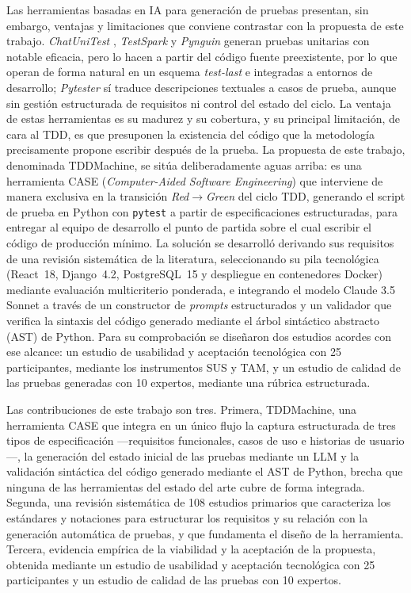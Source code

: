 \documentclass[10pt,journal,twoside,letterpaper]{IEEEtran}
\begin{document}
	Las herramientas basadas en IA para generación de pruebas presentan, sin embargo, ventajas y limitaciones que conviene contrastar con la propuesta de este trabajo. \emph{ChatUniTest} \cite{chen2024chatunitest}, \emph{TestSpark} \cite{sapozhnikov2024testspark} y \emph{Pynguin} \cite{lukasczyk2022pynguin} generan pruebas unitarias con notable eficacia, pero lo hacen a partir del código fuente preexistente, por lo que operan de forma natural en un esquema \emph{test-last} e integradas a entornos de desarrollo; \emph{Pytester} \cite{takerngsaksiri2025pytester} sí traduce descripciones textuales a casos de prueba, aunque sin gestión estructurada de requisitos ni control del estado del ciclo. La ventaja de estas herramientas es su madurez y su cobertura, y su principal limitación, de cara al TDD, es que presuponen la existencia del código que la metodología precisamente propone escribir después de la prueba. La propuesta de este trabajo, denominada TDDMachine, se sitúa deliberadamente aguas arriba: es una herramienta CASE (\emph{Computer-Aided Software Engineering}) que interviene de manera exclusiva en la transición \emph{Red}$\rightarrow$\emph{Green} del ciclo TDD, generando el script de prueba en Python con \texttt{pytest} a partir de especificaciones estructuradas, para entregar al equipo de desarrollo el punto de partida sobre el cual escribir el código de producción mínimo. La solución se desarrolló derivando sus requisitos de una revisión sistemática de la literatura, seleccionando su pila tecnológica (React~18, Django~4.2, PostgreSQL~15 y despliegue en contenedores Docker) mediante evaluación multicriterio ponderada, e integrando el modelo Claude 3.5 Sonnet a través de un constructor de \emph{prompts} estructurados y un validador que verifica la sintaxis del código generado mediante el árbol sintáctico abstracto (AST) de Python. Para su comprobación se diseñaron dos estudios acordes con ese alcance: un estudio de usabilidad y aceptación tecnológica con 25 participantes, mediante los instrumentos SUS y TAM, y un estudio de calidad de las pruebas generadas con 10 expertos, mediante una rúbrica estructurada.
	
	Las contribuciones de este trabajo son tres. Primera, TDDMachine, una herramienta CASE que integra en un único flujo la captura estructurada de tres tipos de especificación ---requisitos funcionales, casos de uso e historias de usuario---, la generación del estado inicial de las pruebas mediante un LLM y la validación sintáctica del código generado mediante el AST de Python, brecha que ninguna de las herramientas del estado del arte cubre de forma integrada. Segunda, una revisión sistemática de 108 estudios primarios que caracteriza los estándares y notaciones para estructurar los requisitos y su relación con la generación automática de pruebas, y que fundamenta el diseño de la herramienta. Tercera, evidencia empírica de la viabilidad y la aceptación de la propuesta, obtenida mediante un estudio de usabilidad y aceptación tecnológica con 25 participantes y un estudio de calidad de las pruebas con 10 expertos.
	
\end{document}
